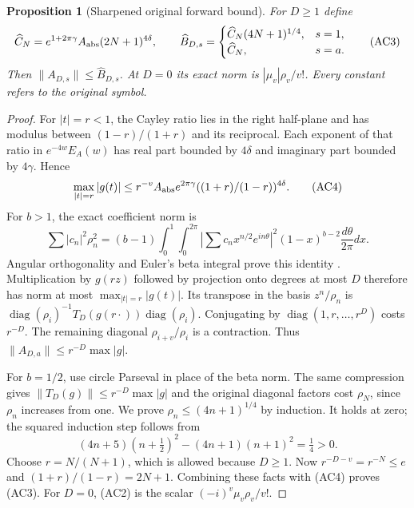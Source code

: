 \documentclass[11pt]{article}
\newtheorem{proposition}[theorem]{Proposition}
\theoremstyle{remark}\newtheorem{remark}[theorem]{Remark}
\begin{document}
\begin{proposition}[Sharpened original forward bound]
For $D\ge1$ define
\[
 \widehat C_N=e^{1+2\pi\gamma} A_{\rm abs}(2N+1)^{4\delta},\qquad
 \widehat B_{D,s}=
 \begin{cases}\widehat C_N(4N+1)^{1/4},&s=1,\\
 \widehat C_N,&s=a.
 \end{cases}\tag{AC3}
\]
Then $\|A_{D,s}\|\le\widehat B_{D,s}$. At $D=0$ its exact norm is
$|\mu_v|\rho_v/v!$. Every constant refers to the original symbol.
\end{proposition}
\begin{proof}
For $|t|=r<1$, the Cayley ratio lies in the right half-plane and has
modulus between $(1-r)/(1+r)$ and its reciprocal. Each exponent of that
ratio in $e^{-4w}E_A(w)$ has real part bounded by $4\delta$ and
imaginary part bounded by $4\gamma$. Hence
\[
 \max_{|t|=r}|g(t)|\le
 r^{-v} A_{\rm abs}e^{2\pi\gamma}
 ((1+r)/(1-r))^{4\delta}.\tag{AC4}
\]
For $b>1$, the exact coefficient norm is
\[
 \sum|c_n|^2\rho_n^2=(b-1)\int_0^1\int_0^{2\pi}
 |\sum c_n x^{n/2}e^{in\theta}|^2(1-x)^{b-2}
 \frac{d\theta}{2\pi}dx.
\]
Angular orthogonality and Euler's beta integral prove this identity
\cite[5.12.1]{DLMF5}. Multiplication by $g(rz)$ followed by projection
onto degrees at most $D$ therefore has norm at most $\max_{|t|=r}|g(t)|$.
Its transpose in the basis $z^n/\rho_n$ is
$\operatorname{diag}(\rho_i)^{-1}T_D(g(r\cdot))
\operatorname{diag}(\rho_i)$. Conjugating by
$\operatorname{diag}(1,r,\ldots,r^D)$ costs $r^{-D}$.
The remaining diagonal $\rho_{i+v}/\rho_i$ is a contraction. Thus
$\|A_{D,a}\|\le r^{-D}\max|g|$.

For $b=1/2$, use circle Parseval in place of the beta norm. The same
compression gives $\|T_D(g)\|\le r^{-D}\max|g|$ and the original
diagonal factors cost $\rho_N$, since $\rho_n$ increases from one.
We prove $\rho_n\le(4n+1)^{1/4}$ by induction. It holds at zero;
the squared induction step follows from
\[
 (4n+5)(n+\tfrac12)^2-(4n+1)(n+1)^2=\tfrac14>0.
\]
Choose $r=N/(N+1)$, which is allowed because $D\ge1$. Now
$r^{-D-v}=r^{-N}\le e$ and $(1+r)/(1-r)=2N+1$.
Combining these facts with (AC4) proves (AC3). For $D=0$, (AC2) is
the scalar $(-i)^v\mu_v\rho_v/v!$.
\end{proof}
\end{document}
